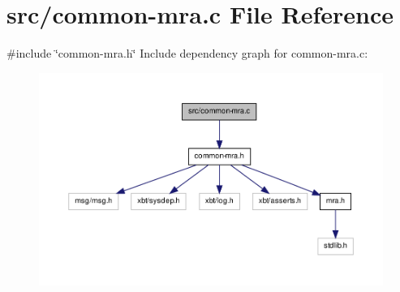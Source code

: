 \hypertarget{common-mra_8c}{\section{src/common-\/mra.c \-File \-Reference}
\label{common-mra_8c}
}
{\ttfamily \#include \char`\"{}common-\/mra.\-h\char`\"{}}\*
\-Include dependency graph for common-\/mra.c\-:\nopagebreak
\begin{figure}[H]
\begin{center}
\leavevmode
\includegraphics[width=350pt]{common-mra_8c__incl}
\end{center}
\end{figure}
